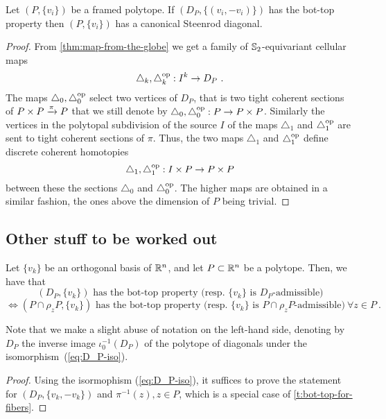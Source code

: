 \begin{theorem}
	Let $(P,\{v_i\})$ be a framed polytope.
	If $(D_P, \{(v_i,-v_i)\})$ has the bot-top property then
	$(P,\{v_i\})$ has a canonical Steenrod diagonal.
\end{theorem}

\begin{proof}
	From \cref{thm:map-from-the-globe} we get a family of $\mathbb{S}_2$-equivariant cellular maps
	\[
	\triangle_k, \triangle_k^{\mathrm{op}} : I^k \to D_P \ .
	\]
	The maps $\triangle_0, \triangle_0^{\mathrm{op}}$ select two vertices of $D_P$, that is two tight coherent sections of $P\times P \xrightarrow{\pi} P$ that we still denote by $\triangle_0, \triangle_0^{\mathrm{op}} : P \to P\times P$.
	Similarly the vertices in the polytopal subdivision of the source $I$ of the maps $\triangle_1$ and $\triangle_1^{\mathrm{op}}$ are sent to tight coherent sections of $\pi$.
	Thus, the two maps $\triangle_1$ and $\triangle_1^{\mathrm{op}}$ define discrete coherent homotopies
	\[
	\triangle_1, \triangle_1^{\mathrm{op}} : I\times P \to P \times P
	\]
	between these the sections $\triangle_0$ and $\triangle_0^{\mathrm{op}}$.
	The higher maps are obtained in a similar fashion, the ones above the dimension of $P$ being trivial.
\end{proof}

\subsection{Other stuff to be worked out}

\begin{lemma} \label{l:bot-top-for-DP}
	Let $\{v_k\}$ be an orthogonal basis of $\mathbb{R}^n$, and let $P\subset \mathbb{R}^n$ be a polytope.
	Then, we have that
	\[
	(D_P,\{v_k\}) \text{ has the bot-top property (resp. } \{v_k\} \text{ is }D_P\text{-admissible)}
	\]
	\[
	\iff (P\cap \rho_z P,\{v_k\}) \text{ has the bot-top property (resp. } \{v_k\} \text{ is }P\cap \rho_z P\text{-admissible)} \ \forall z \in P \ .
	\]
\end{lemma}

Note that we make a slight abuse of notation on the left-hand side, denoting by $D_P$ the inverse image $\iota_0^{-1}(D_P)$ of the polytope of diagonals under the isomorphism~(\ref{eq:D_P-iso}).

\begin{proof}
	Using the isormophism (\ref{eq:D_P-iso}), it suffices to prove the statement for $(D_P,\{v_k,-v_k\})$ and $\pi^{-1}(z), z \in P$, which is a special case of \cref{t:bot-top-for-fibers}.
\end{proof}


